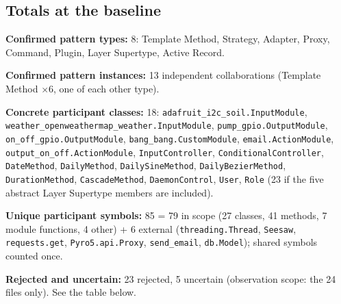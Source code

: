 \documentclass[11pt,a4paper]{article}
\newcommand{\field}[2]{\textbf{#1:} #2\par}
\begin{document}
\subsection{Totals at the baseline}
\field{Confirmed pattern types}{8: Template Method, Strategy, Adapter, Proxy, Command, Plugin, Layer Supertype, Active Record.}
\field{Confirmed pattern instances}{13 independent collaborations (Template Method $\times$6, one of each other type).}
\field{Concrete participant classes}{18: \texttt{adafruit\_\allowbreak{}i2c\_\allowbreak{}soil.\allowbreak{}InputModule}, \texttt{weather\_\allowbreak{}openweathermap\_\allowbreak{}weather.\allowbreak{}InputModule}, \texttt{pump\_\allowbreak{}gpio.\allowbreak{}OutputModule}, \texttt{on\_\allowbreak{}off\_\allowbreak{}gpio.\allowbreak{}OutputModule}, \texttt{bang\_\allowbreak{}bang.\allowbreak{}CustomModule}, \texttt{email.\allowbreak{}ActionModule}, \texttt{output\_\allowbreak{}on\_\allowbreak{}off.\allowbreak{}ActionModule}, \texttt{InputController}, \texttt{ConditionalController}, \texttt{DateMethod}, \texttt{DailyMethod}, \texttt{DailySineMethod}, \texttt{DailyBezierMethod}, \texttt{DurationMethod}, \texttt{CascadeMethod}, \texttt{DaemonControl}, \texttt{User}, \texttt{Role} (23 if the five abstract Layer Supertype members are included).}
\field{Unique participant symbols}{85 = 79 in scope (27 classes, 41 methods, 7 module functions, 4 other) + 6 external (\texttt{threading.\allowbreak{}Thread}, \texttt{Seesaw}, \texttt{requests.\allowbreak{}get}, \texttt{Pyro5.\allowbreak{}api.\allowbreak{}Proxy}, \texttt{send\_\allowbreak{}email}, \texttt{db.\allowbreak{}Model}); shared symbols counted once.}
\field{Rejected and uncertain}{23 rejected, 5 uncertain (observation scope: the 24 files only). See the table below.}
\end{document}
